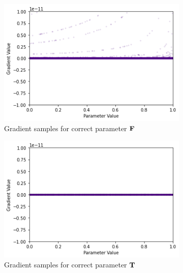 \begin{figure}[ht]
    \centering
    \begin{subfigure}[b]{0.47\textwidth}
        \centering
        \includegraphics[width=\textwidth]{imgs/grad_prod_10_falseparam_100dim.png}
        \caption{Gradient samples for correct parameter $\textbf{F}$}
        \label{fig:conjgrad10false100}
    \end{subfigure}
    \begin{subfigure}[b]{0.47\textwidth}
        \centering
        \includegraphics[width=\textwidth]{imgs/grad_prod_10_trueparam_100dim.png}
        \caption{Gradient samples for correct parameter $\textbf{T}$}
        \label{fig:conjgrad10true100}
    \end{subfigure}
    \begin{subfigure}[b]{0.47\textwidth}
        \centering

\end{subfigure}
\end{figure}
